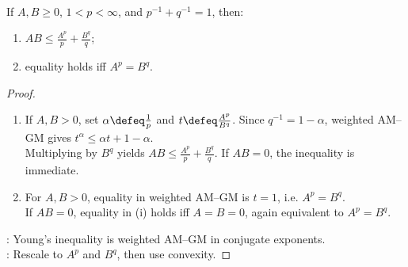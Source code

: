 \begin{lemma} \label{lem:young-inequality-for-holder} \\
If $A,B\geq0$, $1<p<\infty$, and $p^{-1}+q^{-1}=1$, then:
\begin{enumerate}[label=(\roman*)]
\setlength{\itemsep}{0pt}
\item $AB\leq\frac{A^p}{p}+\frac{B^q}{q}$;
\item equality holds iff $A^p=B^q$.
\end{enumerate}
\begin{proof}
\begin{enumerate}[label=(\roman*)]
\setlength{\itemsep}{0pt}
\item If $A,B>0$, set $\alpha\defeq\frac{1}{p}$ and $t\defeq\frac{A^p}{B^q}$. Since $q^{-1}=1-\alpha$, weighted AM--GM gives $t^\alpha\leq\alpha t+1-\alpha$.\\
Multiplying by $B^q$ yields $AB\leq\frac{A^p}{p}+\frac{B^q}{q}$. If $AB=0$, the inequality is immediate.
\item For $A,B>0$, equality in weighted AM--GM is $t=1$, i.e. $A^p=B^q$.\\
If $AB=0$, equality in (i) holds iff $A=B=0$, again equivalent to $A^p=B^q$.
\end{enumerate}
: Young's inequality is weighted AM--GM in conjugate exponents.\\
: Rescale to $A^p$ and $B^q$, then use convexity.
\end{proof}
\end{lemma}

